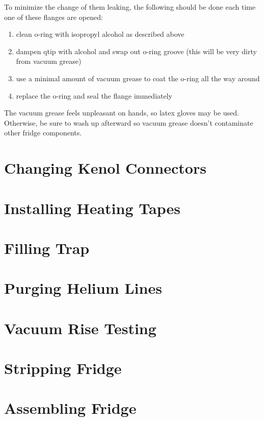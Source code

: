 To minimize the change of them leaking, the following should be done each time one of these flanges are opened:

\begin{enumerate}
 \item clean o-ring with isopropyl alcohol as described above
 \item dampen qtip with alcohol and swap out o-ring groove (this will be very dirty from vacuum grease)
 \item use a minimal amount of vacuum grease to coat the o-ring all the way around
 \item replace the o-ring and seal the flange immediately
\end{enumerate}

The vacuum grease feels unpleasant on hands, so latex gloves may be used.  Otherwise, be sure to wash up afterward so vacuum grease doesn't contaminate other fridge components.



\section{Changing Kenol Connectors}

\section{Installing Heating Tapes}

\section{Filling \lnn{} Trap}

\section{Purging Helium Lines}

\section{Vacuum Rise Testing}

\section{Stripping Fridge}

\section{Assembling Fridge}

